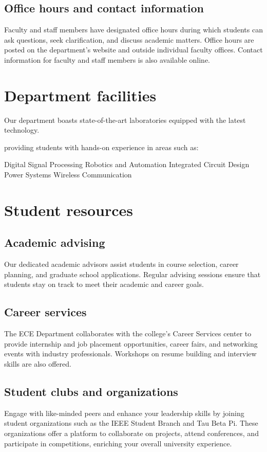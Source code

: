 \subsection{Office hours and contact information}
\label{sec:office-hours-contact}

Faculty and staff members have designated office hours during which students can ask questions, seek clarification, and discuss academic matters. Office hours are posted on the department's website and outside individual faculty offices. Contact information for faculty and staff members is also available online.


\section{Department facilities}
\label{sec:departm-facil}

Our department boasts state-of-the-art laboratories equipped with the latest technology.


providing students with hands-on experience in areas such as:

Digital Signal Processing
Robotics and Automation
Integrated Circuit Design
Power Systems
Wireless Communication


\section{Student resources}
\label{sec:student-resources}

\subsection{Academic advising}
\label{sec:academic-advising}


Our dedicated academic advisors assist students in course selection, career planning, and graduate school applications. Regular advising sessions ensure that students stay on track to meet their academic and career goals.

\subsection{Career services}
\label{sec:career-services}

The ECE Department collaborates with the college's Career Services center to provide internship and job placement opportunities, career fairs, and networking events with industry professionals. Workshops on resume building and interview skills are also offered.

\subsection{Student clubs and organizations}
\label{sec:stud-clubs-organ}

Engage with like-minded peers and enhance your leadership skills by joining student organizations such as the IEEE Student Branch and Tau Beta Pi. These organizations offer a platform to collaborate on projects, attend conferences, and participate in competitions, enriching your overall university experience.

